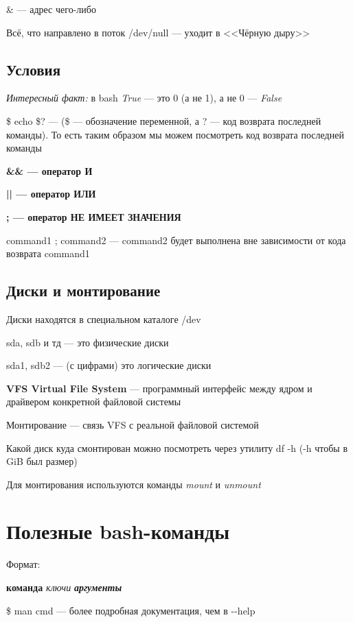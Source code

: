 \documentclass[oneside, final, 14pt]{extreport} %
\begin{document}
\& --- адрес чего-либо

Всё, что направлено в поток /dev/null --- уходит в <<Чёрную дыру>>

\subsection{Условия}

\textit{Интересный факт:} в bash \textit{True} --- это 0 (а не 1), а не 0 --- \textit{False}

\$ echo \$? --- (\$ --- обозначение переменной, а ? --- код возврата последней команды). То есть таким образом
мы можем посмотреть код возврата последней команды

\textbf{\&\& --- оператор И}

\textbf{|| --- оператор ИЛИ}

\textbf{; --- оператор НЕ ИМЕЕТ ЗНАЧЕНИЯ}

command1 ; command2 --- command2 будет выполнена вне зависимости от кода возврата command1

\subsection{Диски и монтирование}
Диски находятся в специальном каталоге /dev

sda, sdb  и тд --- это физические диски

sda1, sdb2 --- (с цифрами) это логические диски

\textbf{VFS Virtual File System} --- программный интерфейс между ядром и драйвером конкретной
файловой системы

Монтирование --- связь VFS с реальной файловой системой

Какой диск куда смонтирован можно посмотреть через утилиту df -h (-h чтобы в GiB был размер)

Для монтирования используются команды \textit{mount} и \textit{unmount}



\section{Полезные bash-команды}

Формат:

\textbf{команда} \textit{ключи} \textbf{\textit{аргументы}}

\vspace{\baselineskip}

\$ man cmd --- более подробная документация, чем в \--\--help
\end{document}

